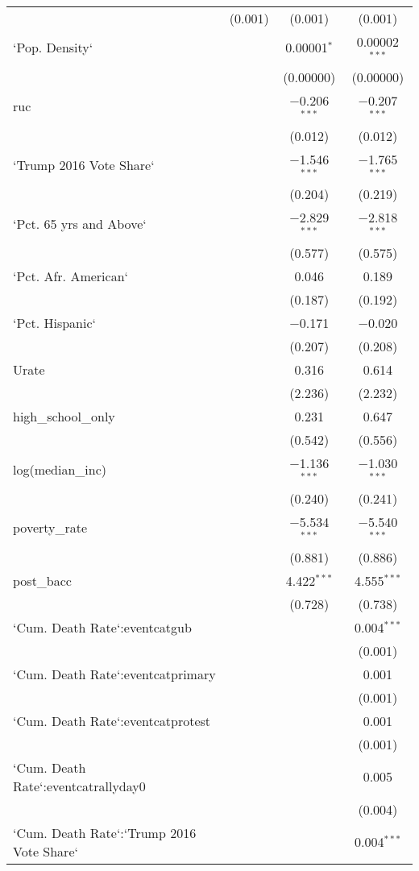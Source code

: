 \begin{table}[!htbp]
\begin{tabular}{@{\extracolsep{5pt}}lccc}
  & (0.001) & (0.001) & (0.001) \\ 
  `Pop. Density` &  & 0.00001$^{*}$ & 0.00002$^{***}$ \\ 
  &  & (0.00000) & (0.00000) \\ 
  ruc &  & $-$0.206$^{***}$ & $-$0.207$^{***}$ \\ 
  &  & (0.012) & (0.012) \\ 
  `Trump 2016 Vote Share` &  & $-$1.546$^{***}$ & $-$1.765$^{***}$ \\ 
  &  & (0.204) & (0.219) \\ 
  `Pct. 65 yrs and Above` &  & $-$2.829$^{***}$ & $-$2.818$^{***}$ \\ 
  &  & (0.577) & (0.575) \\ 
  `Pct. Afr. American` &  & 0.046 & 0.189 \\ 
  &  & (0.187) & (0.192) \\ 
  `Pct. Hispanic` &  & $-$0.171 & $-$0.020 \\ 
  &  & (0.207) & (0.208) \\ 
  Urate &  & 0.316 & 0.614 \\ 
  &  & (2.236) & (2.232) \\ 
  high\_school\_only &  & 0.231 & 0.647 \\ 
  &  & (0.542) & (0.556) \\ 
  log(median\_inc) &  & $-$1.136$^{***}$ & $-$1.030$^{***}$ \\ 
  &  & (0.240) & (0.241) \\ 
  poverty\_rate &  & $-$5.534$^{***}$ & $-$5.540$^{***}$ \\ 
  &  & (0.881) & (0.886) \\ 
  post\_bacc &  & 4.422$^{***}$ & 4.555$^{***}$ \\ 
  &  & (0.728) & (0.738) \\ 
  `Cum. Death Rate`:eventcatgub &  &  & 0.004$^{***}$ \\ 
  &  &  & (0.001) \\ 
  `Cum. Death Rate`:eventcatprimary &  &  & 0.001 \\ 
  &  &  & (0.001) \\ 
  `Cum. Death Rate`:eventcatprotest &  &  & 0.001 \\ 
  &  &  & (0.001) \\ 
  `Cum. Death Rate`:eventcatrallyday0 &  &  & 0.005 \\ 
  &  &  & (0.004) \\ 
  `Cum. Death Rate`:`Trump 2016 Vote Share` &  &  & 0.004$^{***}$ \\ 

\end{tabular}
\end{table}
